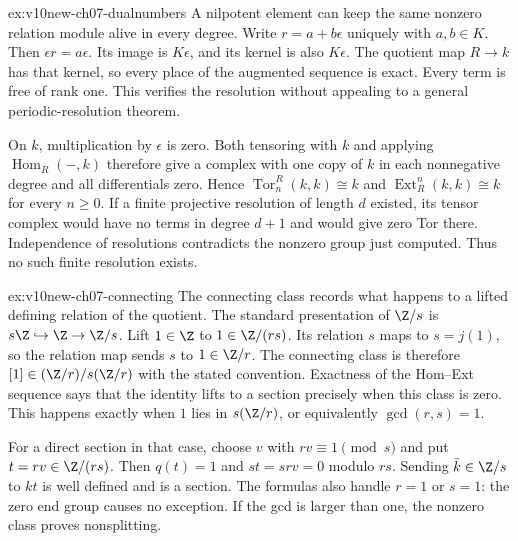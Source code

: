 \begin{solution}{ex:v10new-ch07-dualnumbers}
\idea A nilpotent element can keep the same nonzero relation module alive in every degree.
\writeup Write $r=a+b\epsilon$ uniquely with $a,b\in K$. Then $\epsilon r=a\epsilon$. Its image is $K\epsilon$, and its kernel is also $K\epsilon$. The quotient map $R\to k$ has that kernel, so every place of the augmented sequence is exact. Every term is free of rank one. This verifies the resolution without appealing to a general periodic-resolution theorem.

On $k$, multiplication by $\epsilon$ is zero. Both tensoring with $k$ and applying $\operatorname{Hom}_R(-,k)$ therefore give a complex with one copy of $k$ in each nonnegative degree and all differentials zero. Hence
$\operatorname{Tor}_n^R(k,k)\cong k$ and
$\operatorname{Ext}^n_R(k,k)\cong k$ for every $n\ge0$.
If a finite projective resolution of length $d$ existed, its tensor complex would have no terms in degree $d+1$ and would give zero Tor there. Independence of resolutions contradicts the nonzero group just computed. Thus no such finite resolution exists.
\end{solution}

\begin{solution}{ex:v10new-ch07-connecting}
\idea The connecting class records what happens to a lifted defining relation of the quotient.
\writeup The standard presentation of $\Z/s$ is
$s\Z\hookrightarrow\Z\to\Z/s$. Lift $1\in\Z$ to $1\in\Z/(rs)$. Its relation $s$ maps to $s=j(1)$, so the relation map sends $s$ to $1\in\Z/r$. The connecting class is therefore
$[1]\in(\Z/r)/s(\Z/r)$ with the stated convention. Exactness of the Hom--Ext sequence says that the identity lifts to a section precisely when this class is zero. This happens exactly when $1$ lies in $s(\Z/r)$, or equivalently $\gcd(r,s)=1$.

For a direct section in that case, choose $v$ with $rv\equiv1\pmod s$ and put $t=rv\in\Z/(rs)$. Then $q(t)=1$ and $st=srv=0$ modulo $rs$. Sending $\bar k\in\Z/s$ to $kt$ is well defined and is a section. The formulas also handle $r=1$ or $s=1$: the zero end group causes no exception. If the gcd is larger than one, the nonzero class proves nonsplitting.
\end{solution}

